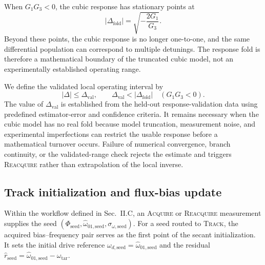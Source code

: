 When $G_1G_3<0$, the cubic response has stationary points at
%
\begin{equation}
\left|\Delta_{\mathrm{fold}}\right|
=
\sqrt{-\frac{2G_1}{G_3}}.
\label{eq:response-fold}
\end{equation}
%
Beyond these points, the cubic response is no longer one-to-one, and the same
differential population can correspond to multiple detunings. The response
fold is therefore a mathematical boundary of the truncated cubic model, not
an experimentally established operating range.

We define the validated local operating interval by
%
\begin{equation}
|\Delta|
\leq
\Delta_{\mathrm{val}},
\qquad
\Delta_{\mathrm{val}}
<
|\Delta_{\mathrm{fold}}|
\quad
(G_1G_3<0).
\label{eq:validated-interval}
\end{equation}
%
The value of $\Delta_{\mathrm{val}}$ is established from the held-out
response-validation data using predefined estimator-error and confidence
criteria. It remains necessary when the cubic model has no real fold because
model truncation, measurement noise, and experimental imperfections can
restrict the usable response before a mathematical turnover occurs. Failure
of numerical convergence, branch continuity, or the validated-range check
rejects the estimate and triggers \textsc{Reacquire} rather than extrapolation
of the local inverse.

%

\subsection{Track initialization and flux-bias update}
\label{sec:calibration-protocol}
Within the workflow defined in Sec.~II.C, an \textsc{Acquire} or
\textsc{Reacquire} measurement supplies the seed
$(\Phi_{\mathrm{seed}},
\widehat\omega_{01,\mathrm{seed}},
\sigma_{\omega,\mathrm{seed}})$.
For a seed routed to \textsc{Track}, the acquired bias--frequency pair serves
as the first point of the secant initialization. It sets the initial drive
reference
$\omega_{d,\mathrm{seed}}
=\widehat\omega_{01,\mathrm{seed}}$
and the residual
$\widehat r_{\mathrm{seed}}
=\widehat\omega_{01,\mathrm{seed}}-\omega_{\mathrm{tar}}$.

